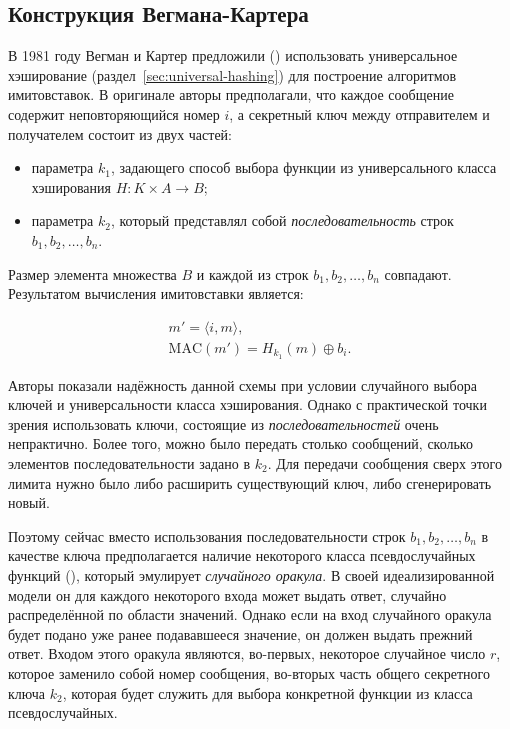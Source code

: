 \subsection{Конструкция Вегмана-Картера}

В 1981 году Вегман и Картер предложили (\cite{Wegman:Carter:1981}) использовать универсальное хэширование (раздел~\ref{sec:universal-hashing}) для построение алгоритмов имитовставок. В оригинале авторы предполагали, что каждое сообщение содержит неповторяющийся номер $i$, а секретный ключ между отправителем и получателем состоит из двух частей:

\begin{itemize}
    \item параметра $k_1$, задающего способ выбора функции из универсального класса хэширования $H: K \times A \to B$;
    \item параметра $k_2$, который представлял собой \emph{последовательность} строк $b_1, b_2, \dots, b_n$.
\end{itemize}

Размер элемента множества $B$ и каждой из строк $b_1, b_2, \dots, b_n$ совпадают. Результатом вычисления имитовставки является:

\[ \begin{array}{l}
    m' = \langle i, m \rangle,\\
    \textrm{MAC} (m') = H_{k_1}(m) \oplus b_i.
\end{array} \]

Авторы показали надёжность данной схемы при условии случайного выбора ключей и универсальности класса хэширования. Однако с практической точки зрения использовать ключи, состоящие из \emph{последовательностей} очень непрактично. Более того, можно было передать столько сообщений, сколько элементов последовательности задано в $k_2$. Для передачи сообщения сверх этого лимита нужно было либо расширить существующий ключ, либо сгенерировать новый.

Поэтому сейчас вместо использования последовательности строк $b_1, b_2, \dots, b_n$ в качестве ключа предполагается наличие некоторого класса псевдослучайных функций (), который эмулирует \emph{случайного оракула}. В своей идеализированной модели он для каждого некоторого входа может выдать ответ, случайно распределённой по области значений. Однако если на вход случайного оракула будет подано уже ранее подававшееся значение, он должен выдать прежний ответ. Входом этого оракула являются, во-первых, некоторое случайное число $r$, которое заменило собой номер сообщения, во-вторых часть общего секретного ключа $k_2$, которая будет служить для выбора конкретной функции из класса псевдослучайных.

